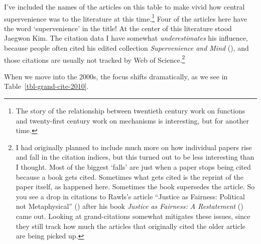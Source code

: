 \documentclass[
  12pt,
  letterpaper,
  DIV=11,
  numbers=noendperiod]{scrartcl}
\begin{document}
I've included the names of the articles on this table to make vivid how
central supervenience was to the literature at this time.\footnote{The
  story of the relationship between twentieth century work on functions
  and twenty-first century work on mechanisms is interesting, but for
  another time.} Four of the articles here have the word `supervenience'
in the title! At the center of this literature stood Jaegwon Kim. The
citation data I have somewhat \emph{underestimates} his influence,
because people often cited his edited collection \emph{Supervenience and
Mind} (), and
those citations are usually not tracked by Web of Science.\footnote{I
  had originally planned to include much more on how individual papers
  rise and fall in the citation indices, but this turned out to be less
  interesting than I thought. Most of the biggest `falls' are just when
  a paper stops being cited because a book gets cited. Sometimes what
  gets cited is the reprint of the paper itself, as happened here.
  Sometimes the book supersedes the article. So you see a drop in
  citations to Rawls's article ``Justice as Fairness: Political not
  Metaphysical'' () after
  his book \emph{Justice as Fairness: A Restatement}
  () came out. Looking at
  grand-citations somewhat mitigates these issues, since they still
  track how much the articles that originally cited the older article
  are being picked up.}

When we move into the 2000s, the focus shifts dramatically, as we see in
Table~\ref{tbl-grand-cite-2010}.
\end{document}
